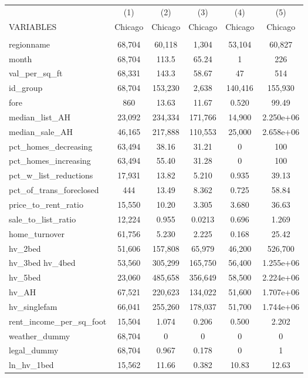 \begin{tabular}{lccccc} \hline
 & (1) & (2) & (3) & (4) & (5) \\
VARIABLES & Chicago & Chicago & Chicago & Chicago & Chicago \\ \hline
 &  &  &  &  &  \\
regionname & 68,704 & 60,118 & 1,304 & 53,104 & 60,827 \\
month & 68,704 & 113.5 & 65.24 & 1 & 226 \\
val\_per\_sq\_ft & 68,331 & 143.3 & 58.67 & 47 & 514 \\
id\_group & 68,704 & 153,230 & 2,638 & 140,416 & 155,930 \\
fore & 860 & 13.63 & 11.67 & 0.520 & 99.49 \\
median\_list\_AH & 23,092 & 234,334 & 171,766 & 14,900 & 2.250e+06 \\
median\_sale\_AH & 46,165 & 217,888 & 110,553 & 25,000 & 2.658e+06 \\
pct\_homes\_decreasing & 63,494 & 38.16 & 31.21 & 0 & 100 \\
pct\_homes\_increasing & 63,494 & 55.40 & 31.28 & 0 & 100 \\
pct\_w\_list\_reductions & 17,931 & 13.82 & 5.210 & 0.935 & 39.13 \\
pct\_of\_trans\_foreclosed & 444 & 13.49 & 8.362 & 0.725 & 58.84 \\
price\_to\_rent\_ratio & 15,550 & 10.20 & 3.305 & 3.680 & 36.63 \\
sale\_to\_list\_ratio & 12,224 & 0.955 & 0.0213 & 0.696 & 1.269 \\
home\_turnover & 61,756 & 5.230 & 2.225 & 0.168 & 25.42 \\
hv\_2bed & 51,606 & 157,808 & 65,979 & 46,200 & 526,700 \\
hv\_3bed 
hv\_4bed & 53,560 & 305,299 & 165,750 & 56,400 & 1.255e+06 \\
hv\_5bed & 23,060 & 485,658 & 356,649 & 58,500 & 2.224e+06 \\
hv\_AH & 67,521 & 220,623 & 134,022 & 51,600 & 1.707e+06 \\
hv\_singlefam & 66,041 & 255,260 & 178,037 & 51,700 & 1.744e+06 \\
rent\_income\_per\_sq\_foot & 15,504 & 1.074 & 0.206 & 0.500 & 2.202 \\
weather\_dummy & 68,704 & 0 & 0 & 0 & 0 \\
legal\_dummy & 68,704 & 0.967 & 0.178 & 0 & 1 \\
ln\_hv\_1bed & 15,562 & 11.66 & 0.382 & 10.83 & 12.63 \\

\end{tabular}
